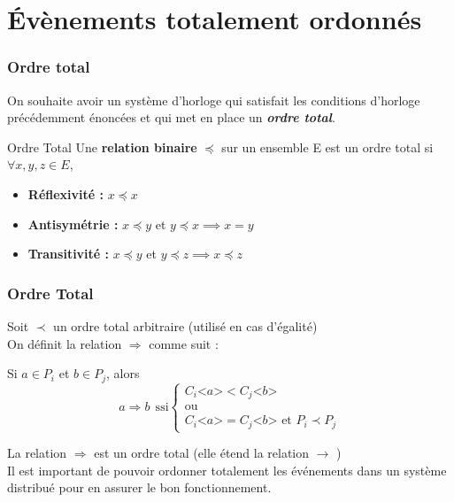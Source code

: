 \documentclass[compress]{beamer}
\begin{document}
\section{\'Evènements totalement ordonnés}
\begin{frame}
\frametitle{Ordre total}
On souhaite avoir un système d'horloge qui satisfait les conditions d'horloge précédemment énoncées et qui met en place un \textit{\textbf{ordre total}}.\\ \bigskip
\begin{block}{Ordre Total}
Une \textbf{relation binaire} $\preceq$ sur un ensemble E est un ordre total si $\forall x, y, z \in E$, \\
\begin{itemize}
\item \textbf{Réflexivité :} $x \preceq x$
\item \textbf{Antisymétrie :} $x \preceq y$ et $y \preceq x \implies x = y$
\item \textbf{Transitivité :} $x \preceq y$ et $y \preceq z \implies x \preceq z$
\end{itemize}
\end{block}
\end{frame}

\begin{frame}
\frametitle{Ordre Total}
Soit $\prec$ un ordre total arbitraire (utilisé en cas d'égalité)\\ \bigskip
On définit la relation $\Rightarrow$ comme suit :\\
\begin{center}
Si $a \in P_i$ et $b \in P_j$, alors \\
\[
	a \Rightarrow b \ \ \text{ssi}
	\begin{cases}
		C_i \text{<}a\text{>} < C_j\text{<}b\text{>} \\
		\text{ou}\\
		C_i\text{<}a\text{>} = C_j\text{<}b\text{>} \text{ et } P_i \prec P_j
	\end{cases}
\]
\end{center}
La relation $\Rightarrow$ est un ordre total (elle étend la relation  $\rightarrow$ )\\
\bigskip
Il est important de pouvoir ordonner totalement les événements dans un système distribué pour en assurer le bon fonctionnement.
\end{frame}
\end{document}
